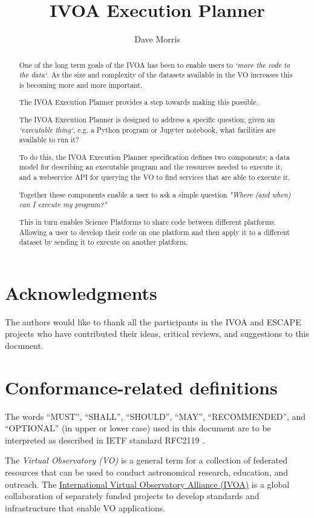 \documentclass[11pt,a4paper]{ivoa}
\title{IVOA Execution Planner}
\author[http://www.ivoa.net/twiki/bin/view/IVOA/DaveMorris]
       {Dave Morris}
\newcommand{\webservice} {webservice\xspace}
\newcommand{\ivoaexecplan} {IVOA Execution Planner\xspace}
\newcommand{\jupyternote} {Jupyter notebook\xspace}
\newcommand{\pythonprog} {Python program\xspace}
\newcommand{\dataset} {dataset\xspace}
\newcommand{\scienceplatform} {Science Platform\xspace}
\begin{document}
\begin{abstract}

One of the long term goals of the IVOA has been to enable users to
\textit{`move the code to the data`}.
As the size and complexity of the \dataset{}s available in the VO increases
this is becoming more and more important.

The \ivoaexecplan provides a step towards making this possible.

The \ivoaexecplan is designed to address a specific question;
given an \textit{`executable thing`}, e.g. a \pythonprog or \jupyternote,
what facilities are available to run it?

To do this, the \ivoaexecplan specification defines two components;
a data model for describing an executable program
and the resources needed to execute it,
and a \webservice API for querying the VO to find services
that are able to execute it.

Together these components enable a user to ask a simple question
\textit{"Where (and when) can I execute my program?"}

This in turn enables \scienceplatform{}s to share code between different platforms.
Allowing a user to develop their code on one platform and then apply it to a different
\dataset by sending it to execute on another platform.

\end{abstract}

\section*{Acknowledgments}

The authors would like to thank all the participants in the IVOA and ESCAPE projects
who have contributed their ideas, critical reviews, and suggestions to this document.

\section*{Conformance-related definitions}

The words ``MUST'', ``SHALL'', ``SHOULD'', ``MAY'', ``RECOMMENDED'', and
``OPTIONAL'' (in upper or lower case) used in this document are to be
interpreted as described in IETF standard RFC2119 \citep{std:RFC2119}.

The \emph{Virtual Observatory (VO)} is a general term for a collection of
federated resources that can be used to conduct astronomical research,
education, and outreach.
The \href{https://www.ivoa.net}{International Virtual Observatory Alliance (IVOA)}
is a global collaboration of separately funded projects to develop standards and
infrastructure that enable VO applications.
\end{document}
